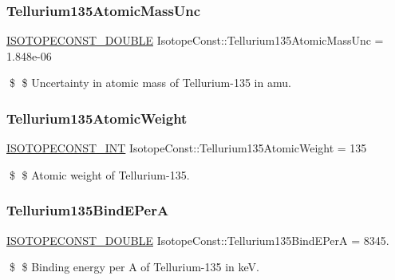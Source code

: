 \subsubsection{\texorpdfstring{Tellurium135\+Atomic\+Mass\+Unc}{Tellurium135AtomicMassUnc}}
{\footnotesize\ttfamily \mbox{\hyperlink{group___isotope_const-_macros_ga8f45a7272ce02c0b4c65c44636ed719a}{I\+S\+O\+T\+O\+P\+E\+C\+O\+N\+S\+T\+\_\+\+D\+O\+U\+B\+LE}} Isotope\+Const\+::\+Tellurium135\+Atomic\+Mass\+Unc = 1.\+848e-\/06}

\$ \$ Uncertainty in atomic mass of Tellurium-\/135 in amu. \mbox{\label{group___isotope_const-_tellurium-_te135_gaf1ba77ceeef973b6f8d35d4f48cbafc5}} 
\subsubsection{\texorpdfstring{Tellurium135\+Atomic\+Weight}{Tellurium135AtomicWeight}}
{\footnotesize\ttfamily \mbox{\hyperlink{group___isotope_const-_macros_ga5f18360b3e99483a35c32d789e62621c}{I\+S\+O\+T\+O\+P\+E\+C\+O\+N\+S\+T\+\_\+\+I\+NT}} Isotope\+Const\+::\+Tellurium135\+Atomic\+Weight = 135}

\$ \$ Atomic weight of Tellurium-\/135. \mbox{\label{group___isotope_const-_tellurium-_te135_gab981ad1c28e5a7684ab43b1c982b19e6}} 
\subsubsection{\texorpdfstring{Tellurium135\+Bind\+E\+PerA}{Tellurium135BindEPerA}}
{\footnotesize\ttfamily \mbox{\hyperlink{group___isotope_const-_macros_ga8f45a7272ce02c0b4c65c44636ed719a}{I\+S\+O\+T\+O\+P\+E\+C\+O\+N\+S\+T\+\_\+\+D\+O\+U\+B\+LE}} Isotope\+Const\+::\+Tellurium135\+Bind\+E\+PerA = 8345.}

\$ \$ Binding energy per A of Tellurium-\/135 in keV. \mbox{\label{group___isotope_const-_tellurium-_te135_gab130493ea9bf8b2e209260773d0fa9d7}} 
